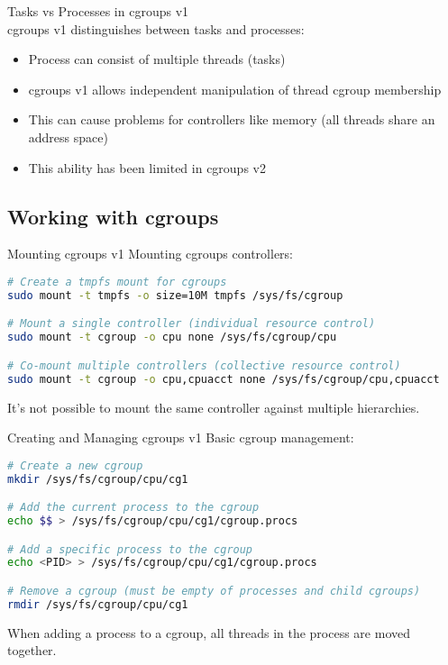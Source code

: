 \multend

\begin{concept}{Tasks vs Processes in cgroups v1}\\
    cgroups v1 distinguishes between tasks and processes:
    \begin{itemize}
        \item Process can consist of multiple threads (tasks)
        \item cgroups v1 allows independent manipulation of thread cgroup membership
        \item This can cause problems for controllers like memory (all threads share an address space)
        \item This ability has been limited in cgroups v2
    \end{itemize}
\end{concept}

\subsection{Working with cgroups}

\begin{code}{Mounting cgroups v1}
    Mounting cgroups controllers:
    
\begin{lstlisting}[language=bash, style=basesmol]
# Create a tmpfs mount for cgroups
sudo mount -t tmpfs -o size=10M tmpfs /sys/fs/cgroup

# Mount a single controller (individual resource control)
sudo mount -t cgroup -o cpu none /sys/fs/cgroup/cpu

# Co-mount multiple controllers (collective resource control)
sudo mount -t cgroup -o cpu,cpuacct none /sys/fs/cgroup/cpu,cpuacct
\end{lstlisting}

    It's not possible to mount the same controller against multiple hierarchies.
\end{code}

\begin{code}{Creating and Managing cgroups v1}
    Basic cgroup management:
    
\begin{lstlisting}[language=bash, style=basesmol]
# Create a new cgroup
mkdir /sys/fs/cgroup/cpu/cg1

# Add the current process to the cgroup
echo $$ > /sys/fs/cgroup/cpu/cg1/cgroup.procs

# Add a specific process to the cgroup
echo <PID> > /sys/fs/cgroup/cpu/cg1/cgroup.procs

# Remove a cgroup (must be empty of processes and child cgroups)
rmdir /sys/fs/cgroup/cpu/cg1
\end{lstlisting}

    When adding a process to a cgroup, all threads in the process are moved together.
\end{code}


